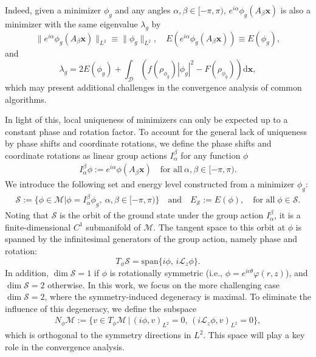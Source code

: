 \documentclass[preprint,3p]{elsarticle}
\begin{document}
Indeed, given a minimizer \(\phi_g\) and any angles \(\alpha, \beta \in [-\pi, \pi)\), $e^{i\alpha}\phi_g(A_{\beta}\bm{x})$ is also a minimizer with the same eigenvalue $\lambda_g$ by
\[
\|e^{i\alpha}\phi_g(A_{\beta}\bm{x})\|_{L^2} \equiv \|\phi_g\|_{L^2},\quad E(e^{i\alpha}\phi_g(A_{\beta}\bm{x})) \equiv E(\phi_g), 
\]
and
\[
\lambda_g=2E(\phi_g)+\int_{\mathcal{D}}\left(f(\rho_{\phi_g})|\phi_g|^2-F(\rho_{\phi_g})\right)\text{d}\bm{x}, 
\]
which may present additional challenges in the convergence analysis of common algorithms. 

In light of this, local uniqueness of minimizers can only be expected up to a constant phase and rotation factor. To account for the general lack of uniqueness by phase shifts and coordinate rotations, we define the phase shifts and coordinate rotations as linear group actions $I_{\alpha}^{\beta}$ for any function $\phi$ 
\begin{align}\label{I-alpha-beta}
	I_{\alpha}^{\beta}\phi:=e^{i\alpha}\phi(A_{\beta}\bm{x})\quad \text{for all}\ \alpha,\beta\in[-\pi, \pi).
\end{align}
We introduce the following set and energy level constructed from a minimizer $\phi_g$:
\begin{align}\label{mathcal_S}
	\mathcal{S}:=\Big\{\phi\in \mathcal{M}\big|\phi=I_{\alpha}^{\beta}\phi_{g},\ \alpha,\beta\in[-\pi, \pi)\Big\}\quad\text{and}\quad E_{\mathcal{S}}:=E(\phi),\quad {\text{for all}}\;\phi\in\mathcal{S}.
\end{align}
Noting that $\mathcal{S}$ is the orbit of the ground state under the group action $I_{\alpha}^{\beta}$, it is a finite-dimensional $C^1$ submanifold of $\mathcal{M}$. {The tangent space to this orbit at $\phi$ is spanned by the infinitesimal generators of the group action, namely phase and rotation:}
\[
T_{\phi}\mathcal{S} = \mathrm{span}\big\{ i\phi,\, i\mathcal{L}_z \phi \big\}.
\]
 In addition, $\dim \mathcal{S} = 1$ if $\phi$ is rotationally symmetric (i.e., $\phi = e^{ic\theta} \varphi(r,z)$), and $\dim \mathcal{S} = 2$ otherwise. In this work, we focus on the more challenging case $\dim \mathcal{S} = 2$, where the symmetry-induced degeneracy is maximal. To eliminate the influence of this degeneracy, we define the subspace
\begin{align}\label{Orth-Complement}
	N_{\phi}\mathcal{M} := \Big\{ v \in T_{\phi}\mathcal{M} \,\Big|\, (i\phi, v)_{L^2} = 0,\, (i\mathcal{L}_z\phi, v)_{L^2} = 0 \Big\},
\end{align}
which is orthogonal to the symmetry directions in $L^2$. This space will play a key role in the convergence analysis.
\end{document}

